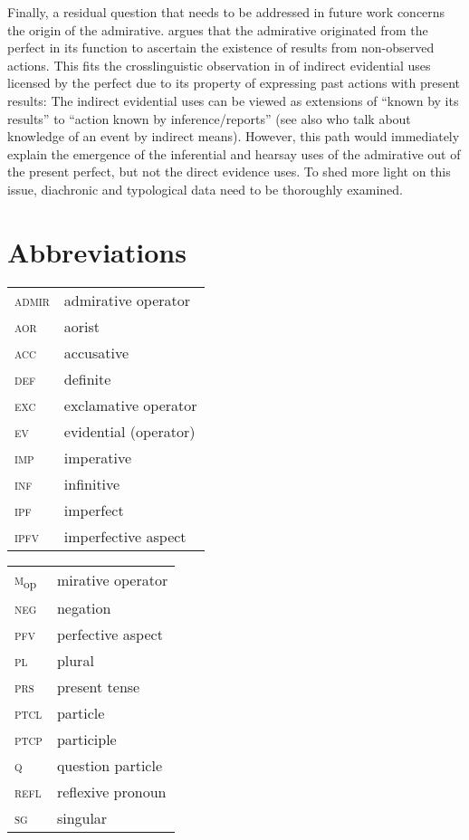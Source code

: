 \documentclass[output=paper]{langscibook}
\begin{document}
Finally, a residual question that needs to be addressed in future work concerns the origin of the admirative. \citet{Nicolova2013} argues that the admirative originated from the perfect in its function to ascertain the existence of results from non-observed actions. This fits the crosslinguistic observation in \citet[73--74]{Bybee.Dahl1989} of indirect evidential uses licensed by the perfect due to its property of expressing past actions with present results: The indirect evidential uses can be viewed as extensions of ``known by its results'' to ``action known by inference/reports'' (see also \citet{Lau.Rooryck2017} who talk about knowledge of an event by indirect means). However, this path would immediately explain the emergence of the inferential and hearsay uses of the admirative out of the present perfect, but not the direct evidence uses. To shed more light on this issue, diachronic and typological data need to be thoroughly examined.

\section*{Abbreviations}
\begin{tabularx}{.5\textwidth}{@{}lQ}
\textsc{admir} & admirative operator\\
\textsc{aor} & aorist\\
\textsc{acc} & accusative\\
\textsc{def} & definite\\
\textsc{exc} & exclamative operator\\
\textsc{ev} & evidential (operator)\\
\textsc{imp} & imperative\\
\textsc{inf} & infinitive\\
\textsc{ipf} & imperfect \\
\textsc{ipfv} & imperfective aspect\\
\end{tabularx}\begin{tabularx}{.5\textwidth}{lQ@{}}
\textsc{m}\textsubscript{op} & mirative operator \\
\textsc{neg} & negation\\
\textsc{pfv} & perfective aspect\\
\textsc{pl} & plural\\
\textsc{prs} & present tense\\
\textsc{ptcl} & particle\\
\textsc{ptcp} & participle\\
\textsc{q} & question particle\\
\textsc{refl} & reflexive pronoun\\
\textsc{sg} & singular\\
\end{tabularx}
\end{document}
